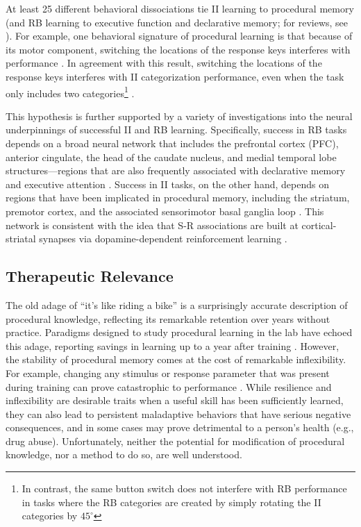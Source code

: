 \documentclass[apacite,draftfirst,man]{apa6}
\begin{document}
At least 25 different behavioral dissociations tie II learning to procedural
memory (and RB learning to executive function and declarative memory; for reviews, see
). For example, one
behavioral signature of procedural learning is that because of its motor
component, switching the locations of the response keys interferes with
performance \cite{WillinghamButtonSwitch2000}. In agreement with this result,
switching the locations of the response keys interferes with II categorization
performance, even when the task only includes two categories\footnote{In
contrast, the same button switch does not interfere with RB performance in tasks
where the RB categories are created by simply rotating the II categories by
$45^\circ$} \cite{AshbyEllWaldron2003, MaddoxBohilIng2004, SpieringAshby2008}.

This hypothesis is further supported by a variety of investigations into the
neural underpinnings of successful II and RB learning. Specifically, success in
RB tasks depends on a broad neural network that includes the prefrontal cortex
(PFC), anterior cingulate, the head of the caudate nucleus, and medial temporal
lobe structures---regions that are also frequently associated with declarative
memory and executive attention \cite{BrownMarsden1988, FiloteoEtAl2007,
MuhammadWallisMiller2006, SegerCincotta2006}. Success in II tasks, on the other
hand, depends on regions that have been implicated in procedural memory,
including the striatum, premotor cortex, and the associated sensorimotor basal
ganglia loop \cite{AshbyEnnis2006, FiloteoMaddoxSalmonSong2005,
KnowltonMangelsSquire1996, NomuraEtAl2007}. This network is consistent with the
idea that S-R associations are built at cortical-striatal synapses via
dopamine-dependent reinforcement learning \cite{AshbyCrossley2011,
HoukAdamsBarto1995, joel_actorcritic_2002}.

\subsection*{Therapeutic Relevance}
The old adage of ``it's like riding a bike'' is a surprisingly accurate
description of procedural knowledge, reflecting its remarkable retention over
years without practice. Paradigms designed to study procedural learning in the
lab have echoed this adage, reporting savings in learning up to a year after
training \cite{Romano2010, turner_long-term_2012}. However, the stability of
procedural memory comes at the cost of remarkable inflexibility. For example,
changing any stimulus or response parameter that was present during training can
prove catastrophic to performance \cite{Rozanov_2010, Dienes_1997}. While
resilience and inflexibility are desirable traits when a useful skill has been
sufficiently learned, they can also lead to persistent maladaptive behaviors
that have serious negative consequences, and in some cases may prove detrimental
to a person's health (e.g., drug abuse). Unfortunately, neither the potential
for modification of procedural knowledge, nor a method to do so, are well
understood.
\end{document}
